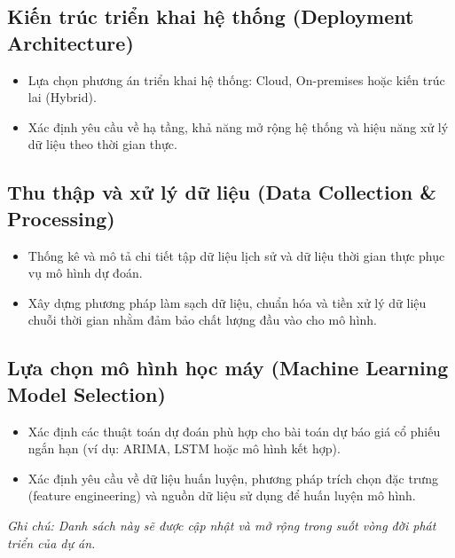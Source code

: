 \documentclass[12pt, a4paper]{article}
\begin{document}
\subsection{Kiến trúc triển khai hệ thống (Deployment Architecture)}
\begin{itemize}
    \item Lựa chọn phương án triển khai hệ thống: Cloud, On-premises hoặc kiến trúc lai (Hybrid).
    \item Xác định yêu cầu về hạ tầng, khả năng mở rộng hệ thống và hiệu năng xử lý dữ liệu theo thời gian thực.
\end{itemize}

\subsection{Thu thập và xử lý dữ liệu (Data Collection \& Processing)}
\begin{itemize}
    \item Thống kê và mô tả chi tiết tập dữ liệu lịch sử và dữ liệu thời gian thực phục vụ mô hình dự đoán.
    \item Xây dựng phương pháp làm sạch dữ liệu, chuẩn hóa và tiền xử lý dữ liệu chuỗi thời gian nhằm đảm bảo chất lượng đầu vào cho mô hình.
\end{itemize}

\subsection{Lựa chọn mô hình học máy (Machine Learning Model Selection)}
\begin{itemize}
    \item Xác định các thuật toán dự đoán phù hợp cho bài toán dự báo giá cổ phiếu ngắn hạn (ví dụ: ARIMA, LSTM hoặc mô hình kết hợp).
    \item Xác định yêu cầu về dữ liệu huấn luyện, phương pháp trích chọn đặc trưng (feature engineering) và nguồn dữ liệu sử dụng để huấn luyện mô hình.
\end{itemize}

\vspace{0.5cm}
\noindent\textit{Ghi chú: Danh sách này sẽ được cập nhật và mở rộng trong suốt vòng đời phát triển của dự án.}
\end{document}
